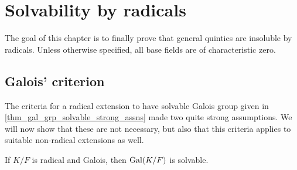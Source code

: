\chapter{Solvability by radicals}

The goal of this chapter is to finally prove that general quintics are insoluble by radicals. Unless otherwise specified, all base fields are of characteristic zero.

\section{Galois' criterion}

The criteria for a radical extension to have solvable Galois group given in \cref{thm_gal_grp_solvable_strong_assns} made two quite strong assumptions. We will now show that these are not necessary, but also that this criteria applies to suitable non-radical extensions as well.

\begin{lemma}
    If $K/F$ is radical and Galois, then $\operatorname{Gal}(K/F)$ is solvable.
\end{lemma}

